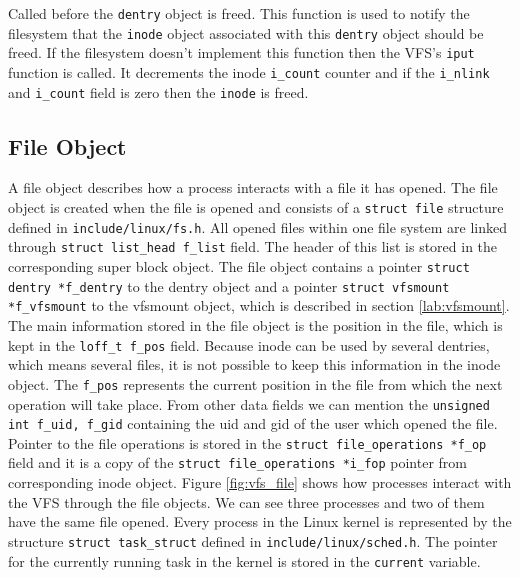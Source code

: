 Called before the \texttt{dentry} object is freed. This function is used to notify
the filesystem that the \texttt{inode} object associated with this \texttt{dentry}
object should be freed. If the filesystem doesn't implement this function then the VFS's
\texttt{iput} function is called. It decrements the inode \texttt{i\_count} counter and
if the \texttt{i\_nlink} and \texttt{i\_count} field is zero then the \texttt{inode} is
freed.

\subsection{File Object}
\label{lab:file}
A file object describes how a process interacts with a file it has opened. The file
object is created when the file is opened and consists of a \texttt{struct file}
structure defined in \texttt{include/linux/fs.h}. All opened files within one file
system are linked through \texttt{struct list\_head f\_list} field. The header of this
list is stored in the corresponding super block object. The file object contains a pointer
\texttt{struct dentry *f\_dentry} to the dentry object and a pointer \texttt{struct
vfsmount *f\_vfsmount} to the vfsmount object, which is described in section
\ref{lab:vfsmount}. The main information stored in the file object is the position in the
file, which is kept in the \texttt{loff\_t f\_pos} field. Because inode can be used by
several dentries, which means several files, it is not possible to keep this
information in the inode object. The \texttt{f\_pos} represents the current position in
the file from which the next operation will take place. From other data fields we can
mention the \texttt{unsigned int f\_uid, f\_gid} containing the uid and gid of
the user which opened the file. Pointer to the file operations is stored in the
\texttt{struct file\_operations *f\_op} field and it is a copy of the \texttt{struct
file\_operations *i\_fop} pointer from corresponding inode object. Figure
\ref{fig:vfs_file} shows how processes interact with the VFS through the file
objects. We can see three processes and two of them have the same file opened. Every
process in the Linux kernel is represented by the structure \texttt{struct task\_struct}
defined in \texttt{include/linux/sched.h}. The pointer for the currently running task
in the kernel is stored in the \texttt{current} variable. 

